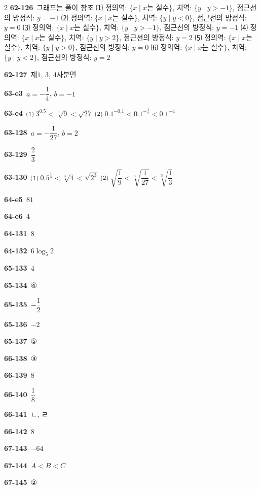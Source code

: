 \documentclass[10pt,a4paper]{article}
\begin{document}
\begin{multicols}{2}
\noindent\textbf{62-126}\ 그래프는 풀이 참조 \quad ⑴ 정의역: $\{x \mid x$는 실수$\}$, 치역: $\{y \mid y>-1\}$, 점근선의 방정식: $y=-1$ \quad ⑵ 정의역: $\{x \mid x$는 실수$\}$, 치역: $\{y \mid y<0\}$, 점근선의 방정식: $y=0$ \quad ⑶ 정의역: $\{x \mid x$는 실수$\}$, 치역: $\{y \mid y>-1\}$, 점근선의 방정식: $y=-1$ \quad ⑷ 정의역: $\{x \mid x$는 실수$\}$, 치역: $\{y \mid y>2\}$, 점근선의 방정식: $y=2$ \quad ⑸ 정의역: $\{x \mid x$는 실수$\}$, 치역: $\{y \mid y>0\}$, 점근선의 방정식: $y=0$ \quad ⑹ 정의역: $\{x \mid x$는 실수$\}$, 치역: $\{y \mid y<2\}$, 점근선의 방정식: $y=2$\par
\noindent\textbf{62-127}\ 제$1$, $3$, $4$사분면\par
\noindent\textbf{63-e3}\ $a=-\dfrac{1}{4}$, $b=-1$\par
\noindent\textbf{63-e4}\ ⑴ $3^{0.5}<\sqrt[3]{9}<\sqrt{27}$ \quad ⑵ $0.1^{-0.1}<0.1^{-\frac{1}{2}}<0.1^{-4}$\par
\noindent\textbf{63-128}\ $a=-\dfrac{1}{27}$, $b=2$\par
\noindent\textbf{63-129}\ $\dfrac{2}{3}$\par
\noindent\textbf{63-130}\ ⑴ $0.5^{\frac{1}{3}}<\sqrt[3]{4}<\sqrt{2^3}$ \quad ⑵ $\sqrt{\dfrac{1}{9}}<\sqrt[4]{\dfrac{1}{27}}<\sqrt[3]{\dfrac{1}{3}}$\par
\noindent\textbf{64-e5}\ $81$\par
\noindent\textbf{64-e6}\ $4$\par
\noindent\textbf{64-131}\ $8$\par
\noindent\textbf{64-132}\ $6\log_5 2$\par
\noindent\textbf{65-133}\ $4$\par
\noindent\textbf{65-134}\ ④\par
\noindent\textbf{65-135}\ $-\dfrac{1}{2}$\par
\noindent\textbf{65-136}\ $-2$\par
\noindent\textbf{65-137}\ ⑤\par
\noindent\textbf{66-138}\ ③\par
\noindent\textbf{66-139}\ $8$\par
\noindent\textbf{66-140}\ $\dfrac{1}{8}$\par
\noindent\textbf{66-141}\ ㄴ, ㄹ\par
\noindent\textbf{66-142}\ $8$\par
\noindent\textbf{67-143}\ $-64$\par
\noindent\textbf{67-144}\ $A<B<C$\par
\noindent\textbf{67-145}\ ②\par

\end{multicols}
\end{document}
